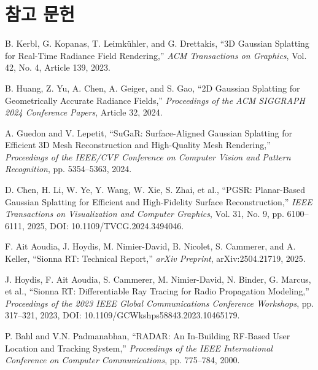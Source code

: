 \documentclass[11pt,a4paper]{article}
\begin{document}
\section{참고 문헌}

\begin{enumerate}[label={[\arabic*]}, ref=\arabic*, leftmargin=2.6em, labelsep=0.6em, itemsep=3pt, topsep=4pt]
  \setlength{\emergencystretch}{1em}\sloppy

  \item\label{bib:1} B. Kerbl, G. Kopanas, T. Leimkühler, and G. Drettakis, ``3D Gaussian Splatting for Real-Time Radiance
Field Rendering,'' \textit{ACM Transactions on Graphics}, Vol. 42, No. 4, Article 139, 2023.

  \item\label{bib:2} B. Huang, Z. Yu, A. Chen, A. Geiger, and S. Gao, ``2D Gaussian Splatting for Geometrically Accurate
Radiance Fields,'' \textit{Proceedings of the ACM SIGGRAPH 2024 Conference Papers}, Article 32, 2024.

  \item\label{bib:3} A. Guedon and V. Lepetit, ``SuGaR: Surface-Aligned Gaussian Splatting for Efficient 3D Mesh
Reconstruction and High-Quality Mesh Rendering,'' \textit{Proceedings of the IEEE/CVF Conference on
Computer Vision and Pattern Recognition}, pp. 5354--5363, 2024.

  \item\label{bib:4} D. Chen, H. Li, W. Ye, Y. Wang, W. Xie, S. Zhai, et al., ``PGSR: Planar-Based Gaussian Splatting for
Efficient and High-Fidelity Surface Reconstruction,'' \textit{IEEE Transactions on Visualization and
Computer Graphics}, Vol. 31, No. 9, pp. 6100--6111, 2025, DOI: 10.1109/TVCG.2024.3494046.

  \item\label{bib:5} F. Ait Aoudia, J. Hoydis, M. Nimier-David, B. Nicolet, S. Cammerer, and A. Keller, ``Sionna RT:
Technical Report,'' \textit{arXiv Preprint}, arXiv:2504.21719, 2025.

  \item\label{bib:6} J. Hoydis, F. Ait Aoudia, S. Cammerer, M. Nimier-David, N. Binder, G. Marcus, et al., ``Sionna RT:
Differentiable Ray Tracing for Radio Propagation Modeling,'' \textit{Proceedings of the 2023 IEEE
Global Communications Conference Workshops}, pp. 317--321, 2023, DOI:
10.1109/GCWkshps58843.2023.10465179.

  \item\label{bib:7} P. Bahl and V.N. Padmanabhan, ``RADAR: An In-Building RF-Based User Location and Tracking System,''
\textit{Proceedings of the IEEE International Conference on Computer Communications}, pp. 775--784,
2000.


\end{enumerate}
\end{document}
